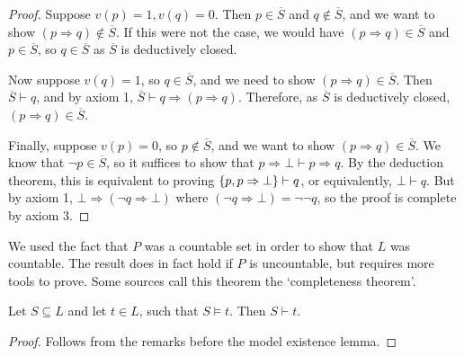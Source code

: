\begin{proof}
    Suppose \( v(p) = 1, v(q) = 0 \).
    Then \( p \in \overline S \) and \( q \not\in \overline S \), and we want to show \( (p \Rightarrow q) \not\in \overline S \).
    If this were not the case, we would have \( (p \Rightarrow q) \in \overline S \) and \( p \in \overline S \), so \( q \in \overline S \) as \( \overline S \) is deductively closed.

    Now suppose \( v(q) = 1 \), so \( q \in \overline S \), and we need to show \( (p \Rightarrow q) \in \overline S \).
    Then \( \overline S \vdash q \), and by axiom 1, \( \overline S \vdash q \Rightarrow (p \Rightarrow q) \).
    Therefore, as \( \overline S \) is deductively closed, \( (p \Rightarrow q) \in \overline S \).

    Finally, suppose \( v(p) = 0 \), so \( p \not\in \overline S \), and we want to show \( (p \Rightarrow q) \in \overline S \).
    We know that \( \neg p \in \overline S \), so it suffices to show that \( p \Rightarrow \bot \vdash p \Rightarrow q \).
    By the deduction theorem, this is equivalent to proving \( \qty{p, p \Rightarrow \bot} \vdash q \), or equivalently, \( \bot \vdash q \).
    But by axiom 1, \( \bot \Rightarrow (\neg q \Rightarrow \bot) \) where \( (\neg q \Rightarrow \bot) = \neg\neg q \), so the proof is complete by axiom 3.
\end{proof}
\begin{remark}
    We used the fact that \( P \) was a countable set in order to show that \( L \) was countable.
    The result does in fact hold if \( P \) is uncountable, but requires more tools to prove.
    Some sources call this theorem the `completeness theorem'.
\end{remark}
\begin{corollary}[adequacy]
    Let \( S \subseteq L \) and let \( t \in L \), such that \( S \models t \).
    Then \( S \vdash t \).
\end{corollary}
\begin{proof}
    Follows from the remarks before the model existence lemma.
\end{proof}

